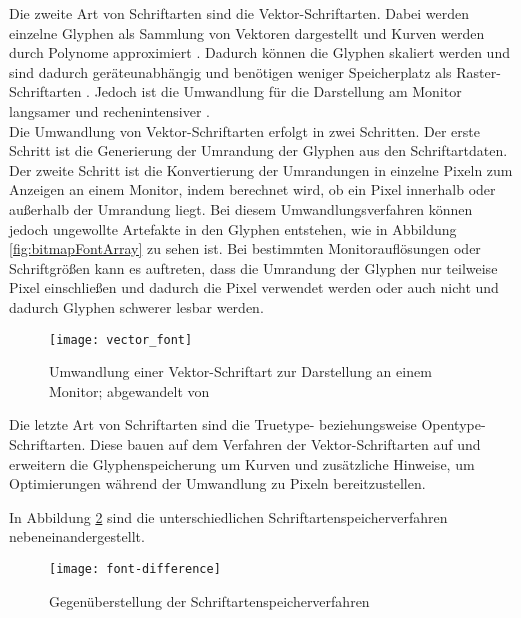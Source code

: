 Die zweite Art von Schriftarten sind die Vektor-Schriftarten. Dabei werden einzelne Glyphen als Sammlung von Vektoren dargestellt und Kurven werden durch Polynome approximiert \cites{microsoftFonts}[S.~24]{hersheyFont}. Dadurch können die Glyphen skaliert werden und sind dadurch geräteunabhängig und benötigen weniger Speicherplatz als Raster-Schriftarten \cites{strizverFont}{microsoftFonts}. Jedoch ist die Umwandlung für die Darstellung am Monitor langsamer und rechenintensiver \cites{microsoftFonts}{microsoftTrueType}.\\
Die Umwandlung von Vektor-Schriftarten erfolgt in zwei Schritten. Der erste Schritt ist die Generierung der Umrandung der Glyphen aus den Schriftartdaten. Der zweite Schritt ist die Konvertierung der Umrandungen in einzelne Pixeln zum Anzeigen an einem Monitor, indem berechnet wird, ob ein Pixel innerhalb oder außerhalb der Umrandung liegt. \cite{strizverFont}
Bei diesem Umwandlungsverfahren können jedoch ungewollte Artefakte in den Glyphen entstehen, wie in Abbildung \ref{fig:bitmapFontArray} zu sehen ist. Bei bestimmten Monitorauflösungen oder Schriftgrößen kann es auftreten, dass die Umrandung der Glyphen nur teilweise Pixel einschließen und dadurch die Pixel verwendet werden oder auch nicht und dadurch Glyphen schwerer lesbar werden.

\begin{figure}[h]
    \centering
    \texttt{[image: vector\_font]}
    \caption{Umwandlung einer Vektor-Schriftart zur Darstellung an einem Monitor; abgewandelt von \cite{strizverFont}}
    \label{fig:vectorFont}
\end{figure}

Die letzte Art von Schriftarten sind die Truetype- beziehungsweise Opentype-Schriftarten. Diese bauen auf dem Verfahren der Vektor-Schriftarten auf und erweitern die Glyphenspeicherung um Kurven und zusätzliche Hinweise, um Optimierungen während der Umwandlung zu Pixeln bereitzustellen. \cite{microsoftFonts}

In Abbildung \ref{fig:fontDifference} sind die unterschiedlichen Schriftartenspeicherverfahren nebeneinandergestellt.

\begin{figure}[h]
    \centering
    \texttt{[image: font-difference]}
    \caption{Gegenüberstellung der Schriftartenspeicherverfahren}
    \label{fig:fontDifference}
\end{figure}

